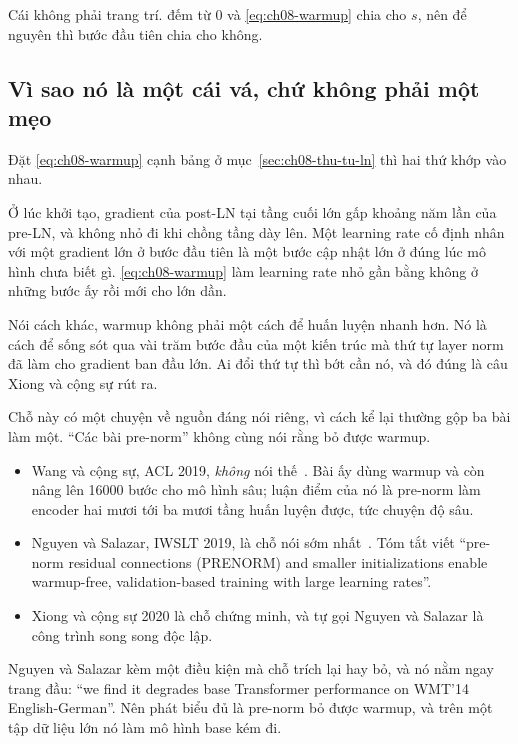 Cái  không phải trang trí.  đếm từ 0 và
\eqref{eq:ch08-warmup} chia cho \(s\), nên để nguyên thì bước đầu tiên chia cho
không.

\subsection*{Vì sao nó là một cái vá, chứ không phải một mẹo}

%
Đặt \eqref{eq:ch08-warmup} cạnh bảng ở mục~\ref{sec:ch08-thu-tu-ln} thì hai thứ
khớp vào nhau.

Ở lúc khởi tạo, gradient của post-LN tại tầng cuối lớn gấp khoảng năm lần của
pre-LN, và không nhỏ đi khi chồng tầng dày lên. Một learning rate cố định nhân
với một gradient lớn ở bước đầu tiên là một bước cập nhật lớn ở đúng lúc mô hình
chưa biết gì. \eqref{eq:ch08-warmup} làm learning rate nhỏ gần bằng không ở
những bước ấy rồi mới cho lớn dần.

Nói cách khác, warmup không phải một cách để huấn luyện nhanh hơn. Nó là cách để
sống sót qua vài trăm bước đầu của một kiến trúc mà thứ tự layer norm đã làm cho
gradient ban đầu lớn. Ai đổi thứ tự thì bớt cần nó, và đó đúng là câu Xiong và
cộng sự rút ra.

%
Chỗ này có một chuyện về nguồn đáng nói riêng, vì cách kể lại thường gộp ba bài
làm một. \enquote{Các bài pre-norm} không cùng nói rằng bỏ được warmup.

\begin{itemize}
  \item Wang và cộng sự, ACL 2019, \emph{không} nói thế~\autocite{wang2019deep}.
    Bài ấy dùng warmup và còn nâng lên 16000 bước cho mô hình sâu; luận điểm của
    nó là pre-norm làm encoder hai mươi tới ba mươi tầng huấn luyện được, tức
    chuyện độ sâu.
  \item Nguyen và Salazar, IWSLT 2019, là chỗ nói sớm
    nhất~\autocite{nguyen2019tears}. Tóm tắt viết \enquote{pre-norm residual
    connections (PRENORM) and smaller initializations enable warmup-free,
    validation-based training with large learning rates}.
  \item Xiong và cộng sự 2020 là chỗ chứng minh, và tự gọi Nguyen và Salazar là
    công trình song song độc lập.
\end{itemize}

Nguyen và Salazar kèm một điều kiện mà chỗ trích lại hay bỏ, và nó nằm ngay
trang đầu: \enquote{we find it degrades base Transformer performance on WMT'14
English-German}. Nên phát biểu đủ là pre-norm bỏ được warmup, và trên một tập dữ
liệu lớn nó làm mô hình base kém đi.

